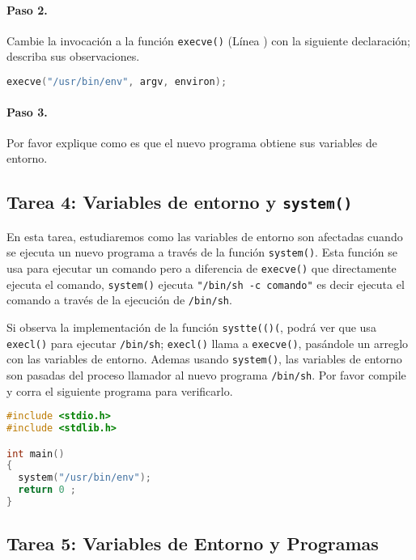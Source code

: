 \paragraph{Paso 2.} Cambie la invocación a la función {\tt execve()} (Línea ) con la siguiente declaración; describa sus observaciones.


\begin{lstlisting}[language=C]
execve("/usr/bin/env", argv, environ);
\end{lstlisting}


\paragraph{Paso 3.} Por favor explique como es que el nuevo programa obtiene sus variables de entorno.



\subsection{Tarea 4: Variables de entorno y {\tt system()}}

En esta tarea, estudiaremos como las variables de entorno son afectadas cuando se ejecuta un nuevo programa a través de la función {\tt system()}. Esta función se usa para ejecutar un comando pero a diferencia de {\tt execve()} que directamente ejecuta el comando, {\tt system()} ejecuta \texttt{"/bin/sh -c comando"} es decir ejecuta el comando  a través de la ejecución de {\tt /bin/sh}.

Si observa la implementación de la función {\tt systte(()(}, podrá ver que usa {\tt execl()} para ejecutar {\tt /bin/sh}; {\tt execl()} llama a {\tt execve()}, pasándole un arreglo con las variables de entorno. 
Ademas usando {\tt system()}, las variables de entorno son pasadas del proceso llamador al nuevo programa {\tt /bin/sh}. Por favor compile y corra el siguiente programa para verificarlo.


\begin{lstlisting}[language=C]
#include <stdio.h>
#include <stdlib.h>

int main()
{
  system("/usr/bin/env");
  return 0 ;
}
\end{lstlisting}



\subsection{Tarea 5: Variables de Entorno y Programas \setuid }

